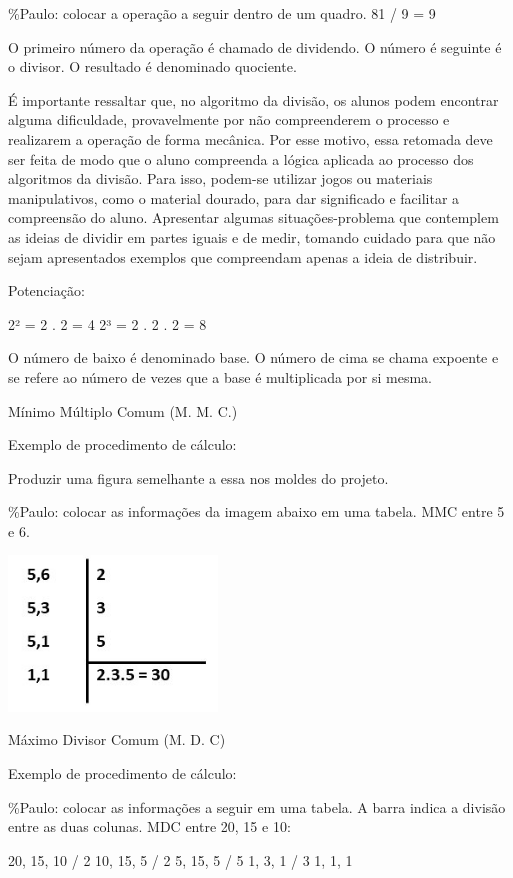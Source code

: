 \%Paulo: colocar a operação a seguir dentro de um quadro. 81 / 9 = 9

O primeiro número da operação é chamado de dividendo. O número é
seguinte é o divisor. O resultado é denominado quociente.

É importante ressaltar que, no algoritmo da divisão, os alunos podem
encontrar alguma dificuldade, provavelmente por não compreenderem o
processo e realizarem a operação de forma mecânica. Por esse motivo,
essa retomada deve ser feita de modo que o aluno compreenda a lógica
aplicada ao processo dos algoritmos da divisão. Para isso, podem-se
utilizar jogos ou materiais manipulativos, como o material dourado, para
dar significado e facilitar a compreensão do aluno. Apresentar algumas
situações-problema que contemplem as ideias de dividir em partes iguais
e de medir, tomando cuidado para que não sejam apresentados exemplos que
compreendam apenas a ideia de distribuir.

Potenciação:

2² = 2 . 2 = 4 2³ = 2 . 2 . 2 = 8

O número de baixo é denominado base. O número de cima se chama expoente
e se refere ao número de vezes que a base é multiplicada por si mesma.

Mínimo Múltiplo Comum (M. M. C.)

Exemplo de procedimento de cálculo:

Produzir uma figura semelhante a essa nos moldes do projeto.

\%Paulo: colocar as informações da imagem abaixo em uma tabela. MMC
entre 5 e 6.

\includegraphics[width=2.18605in,height=1.62945in]{./imgSAEB_6_MAT/media/image21.jpeg}

Máximo Divisor Comum (M. D. C)

Exemplo de procedimento de cálculo:

\%Paulo: colocar as informações a seguir em uma tabela. A barra indica a
divisão entre as duas colunas. MDC entre 20, 15 e 10:

20, 15, 10 / 2 10, 15, 5 / 2 5, 15, 5 / 5 1, 3, 1 / 3 1, 1, 1

